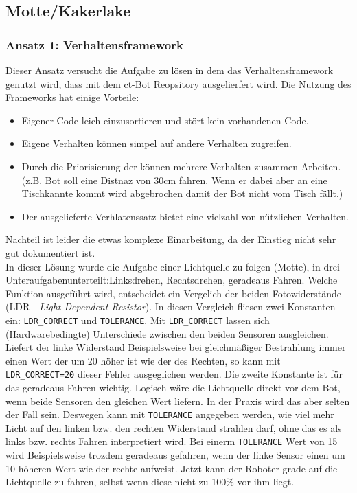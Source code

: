 \subsection{Motte/Kakerlake}
\label{motte_kakerlake}

\subsubsection{Ansatz 1: Verhaltensframework}
Dieser Ansatz versucht die Aufgabe zu lösen in dem das Verhaltensframework
genutzt wird, dass mit dem ct-Bot Reopsitory ausgelierfert wird. Die Nutzung des 
Frameworks hat einige Vorteile:
\begin{itemize}
	\item Eigener Code leich einzusortieren und stört kein vorhandenen Code.
	\item Eigene Verhalten können simpel auf andere Verhalten zugreifen.
	\item Durch die Priorisierung der können mehrere Verhalten zusammen Arbeiten.
		(z.B. Bot soll eine Distnaz von 30cm fahren. Wenn er dabei aber an eine
		Tischkannte kommt wird abgebrochen damit der Bot nicht vom Tisch fällt.)
	\item Der ausgelieferte Verhlatenssatz bietet eine vielzahl von nützlichen
		Verhalten.
\end{itemize}
Nachteil ist leider die etwas komplexe Einarbeitung, da der Einstieg nicht sehr gut
dokumentiert ist. \\

In dieser Lösung wurde die Aufgabe einer Lichtquelle zu folgen (Motte), in drei
Unteraufgabenunterteilt:Linksdrehen, Rechtsdrehen, geradeaus Fahren.
Welche Funktion ausgeführt wird, entscheidet ein Vergelich der beiden Fotowiderstände
(LDR - \textit{Light Dependent Resistor}). In diesen Vergleich fliesen zwei Konstanten ein:
\verb+LDR_CORRECT+ und \verb+TOLERANCE+. Mit \verb+LDR_CORRECT+ lassen sich
(Hardwarebedingte) Unterschiede zwischen den beiden Sensoren ausgleichen. Liefert
der linke Widerstand Beispielsweise bei gleichmäßiger Bestrahlung immer einen
Wert der um 20 höher ist wie der des Rechten, so kann mit \verb+LDR_CORRECT=20+ dieser
Fehler ausgeglichen werden. Die zweite Konstante ist für das geradeaus Fahren wichtig.
Logisch wäre die Lichtquelle direkt vor dem Bot, wenn beide Sensoren den gleichen
Wert liefern. In der Praxis wird das aber selten der Fall sein. Deswegen kann mit
\verb+TOLERANCE+ angegeben werden, wie viel mehr Licht auf den linken bzw. den rechten
Widerstand strahlen darf, ohne das es als links bzw. rechts Fahren interpretiert wird.
Bei einerm \verb+TOLERANCE+ Wert von 15 wird Beispielsweise trozdem geradeaus gefahren,
wenn der linke Sensor einen um 10 höheren Wert wie der rechte aufweist. Jetzt kann
der Roboter grade auf die Lichtquelle zu fahren, selbst wenn diese nicht zu 100\%
vor ihm liegt. \\

